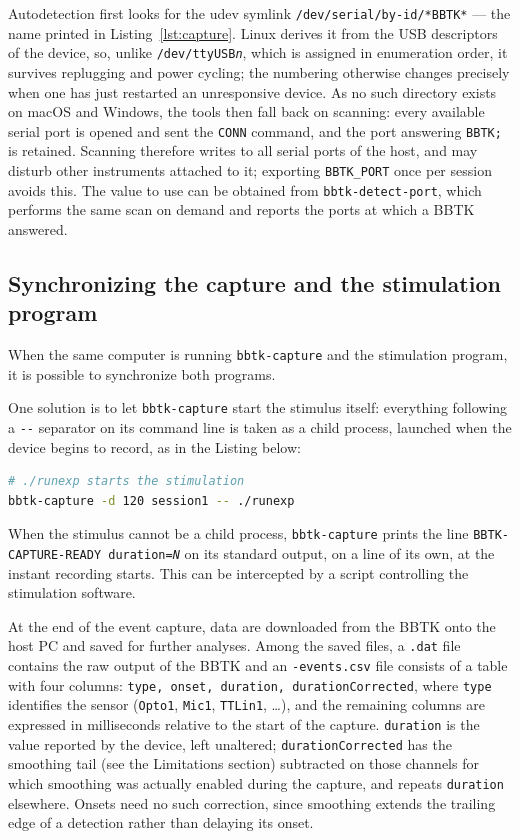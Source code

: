 \documentclass[jou,a4paper]{apa7}
\begin{document}
Autodetection first looks for the udev symlink
\texttt{/dev/serial/by-id/*BBTK*} --- the name printed in
Listing~\ref{lst:capture}. Linux derives it from the USB descriptors
of the device, so, unlike \texttt{/dev/ttyUSB\textit{n}}, which is
assigned in enumeration order, it survives replugging and power
cycling; the numbering otherwise changes precisely when one has just
restarted an unresponsive device. As no such directory exists on macOS
and Windows, the tools then fall back on scanning: every available
serial port is opened and sent the \texttt{CONN} command, and the port
answering \texttt{BBTK;} is retained. Scanning therefore writes to all
serial ports of the host, and may disturb other instruments attached
to it; exporting \texttt{BBTK\_PORT} once per session avoids this. The
value to use can be obtained from \texttt{bbtk-detect-port}, which
performs the same scan on demand and reports the ports at which a BBTK
answered.

\subsection{Synchronizing the capture and the stimulation program}

When the same computer is running \texttt{bbtk-capture} and the stimulation program, it is possible to synchronize both programs.

One solution is to let
\texttt{bbtk-capture} start the stimulus itself: everything following a
\texttt{-}\texttt{-} separator on its command line is taken as a child process, launched when the device
begins to record, as in the Listing below: 

\begin{lstlisting}[language=bash, frame=none, numbers=none, basicstyle=\ttfamily\small]
# ./runexp starts the stimulation
bbtk-capture -d 120 session1 -- ./runexp
\end{lstlisting}

When the stimulus cannot be a child process, \texttt{bbtk-capture} prints the line
\texttt{BBTK-CAPTURE-READY duration=\textit{N}} on its standard output,
on a line of its own, at the instant recording starts. This can be intercepted by a script controlling the stimulation software. 

At the end of the event capture, data are downloaded from the BBTK
onto the host PC and saved for further analyses. Among the saved
files, a \texttt{.dat} file contains the raw output of the BBTK and an
\texttt{-events.csv} file consists of a table with four columns:
\texttt{type, onset, duration, durationCorrected}, where \texttt{type}
identifies the sensor (\texttt{Opto1}, \texttt{Mic1}, \texttt{TTLin1},
\ldots), and the remaining columns are expressed in milliseconds
relative to the start of the capture. \texttt{duration} is the value
reported by the device, left unaltered; \texttt{durationCorrected} has
the smoothing tail (see the Limitations section) subtracted on those
channels for which smoothing was actually enabled during the capture,
and repeats \texttt{duration} elsewhere. Onsets need no such correction,
since smoothing extends the trailing edge of a detection rather than
delaying its onset.
\end{document}
